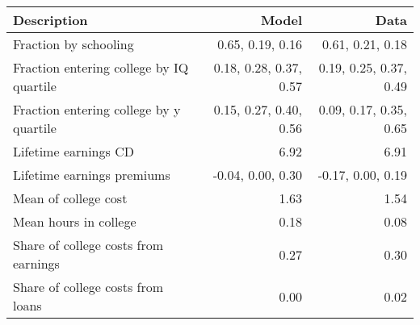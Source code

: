 \begin{tabular}{lrr}
\hline
Description & Model  & Data  \\ 
\hline
Fraction by schooling & 0.65, 0.19, 0.16  & 0.61, 0.21, 0.18  \\ 
Fraction entering college by IQ quartile & 0.18, 0.28, 0.37, 0.57  & 0.19, 0.25, 0.37, 0.49  \\ 
Fraction entering college by y quartile & 0.15, 0.27, 0.40, 0.56  & 0.09, 0.17, 0.35, 0.65  \\ 
Lifetime earnings CD & 6.92  & 6.91  \\ 
Lifetime earnings premiums & -0.04, 0.00, 0.30  & -0.17, 0.00, 0.19  \\ 
Mean of college cost & 1.63  & 1.54  \\ 
Mean hours in college & 0.18  & 0.08  \\ 
Share of college costs from earnings & 0.27  & 0.30  \\ 
Share of college costs from loans & 0.00  & 0.02  \\ 
\hline
\end{tabular}%
